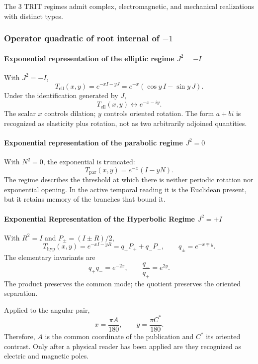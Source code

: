 \noindent The 3 TRIT regimes admit complex, electromagnetic, and mechanical realizations with distinct types.\par\medskip

\subsubsection{Operator quadratic of root internal of \(-1\)}

\paragraph{Exponential representation of the elliptic regime \(J^2=-I\)}

With \(J^2=-I\),
\begin{equation}
T_{\mathrm{ell}}(x,y)=e^{-xI-yJ}
=e^{-x}(\cos y\,I-\sin y\,J).
\label{eq:elliptic-exp}
\end{equation}
Under the identification generated by \(J\),
\[
T_{\mathrm{ell}}(x,y)\longleftrightarrow e^{-x-iy}.
\]
The scalar \(x\) controls dilation; \(y\) controls oriented
rotation. The form \(a+bi\) is recognized as elasticity plus rotation,
not as two arbitrarily adjoined quantities.

\paragraph{Exponential representation of the parabolic regime \(J^2=0\)}

With \(N^2=0\), the exponential is truncated:
\begin{equation}
T_{\mathrm{par}}(x,y)=e^{-x}(I-yN).
\label{eq:parabolic-exp}
\end{equation}
The regime describes the threshold at which there is neither periodic rotation nor exponential opening. In the active temporal reading it is the Euclidean present, but it retains memory of the branches that bound it.

\paragraph{Exponential Representation of the Hyperbolic Regime \(J^2=+I\)}

With \(R^2=I\) and \(P_\pm=(I\pm R)/2\),
\begin{equation}
T_{\mathrm{hyp}}(x,y)=e^{-xI-yR}
=q_+P_++q_-P_-,
\qquad q_\pm=e^{-x\mp y}.
\label{eq:hyperbolic-exp}
\end{equation}
The elementary invariants are
\begin{equation}
q_+q_-=e^{-2x},
\qquad
\frac{q_-}{q_+}=e^{2y}.
\label{eq:q-product-ratio}
\end{equation}
The product preserves the common mode; the quotient preserves the oriented separation.

Applied to the angular pair,
\[
x=\frac{\pi A}{180},\qquad y=\frac{\pi C^*}{180}.
\]
Therefore, \(A\) is the common coordinate of the publication and \(C^*\) its oriented contrast. Only after a physical reader has been applied are they recognized as electric and magnetic poles.

